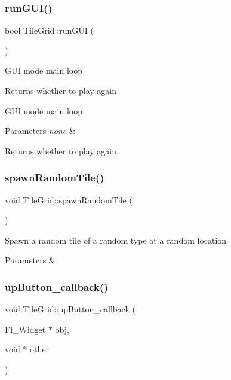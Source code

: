 \subsubsection{\texorpdfstring{run\+G\+U\+I()}{runGUI()}}
{\footnotesize\ttfamily bool Tile\+Grid\+::run\+G\+UI (\begin{DoxyParamCaption}{ }\end{DoxyParamCaption})}

G\+UI mode main loop

\begin{DoxyReturn}{Returns}
whether to play again
\end{DoxyReturn}
G\+UI mode main loop


\begin{DoxyParams}{Parameters}
{\em none} & \\
\hline
\end{DoxyParams}
\begin{DoxyReturn}{Returns}
whether to play again 
\end{DoxyReturn}
\mbox{\label{classTileGrid_a01cbaad58637ed2a500beebc1ff784eb}} 
\subsubsection{\texorpdfstring{spawn\+Random\+Tile()}{spawnRandomTile()}}
{\footnotesize\ttfamily void Tile\+Grid\+::spawn\+Random\+Tile (\begin{DoxyParamCaption}{ }\end{DoxyParamCaption})}

Spawn a random tile of a random type at a random location


\begin{DoxyParams}{Parameters}
{\em } & \\
\hline
\end{DoxyParams}
\mbox{\label{classTileGrid_aa50de7f1238128fea9f07d7f5bd4b492}} 
\subsubsection{\texorpdfstring{up\+Button\+\_\+callback()}{upButton\_callback()}}
{\footnotesize\ttfamily void Tile\+Grid\+::up\+Button\+\_\+callback (\begin{DoxyParamCaption}\item[{Fl\+\_\+\+Widget $\ast$}]{obj,  }\item[{void $\ast$}]{other }\end{DoxyParamCaption})\hspace{0.3cm}{\ttfamily [static]}}

